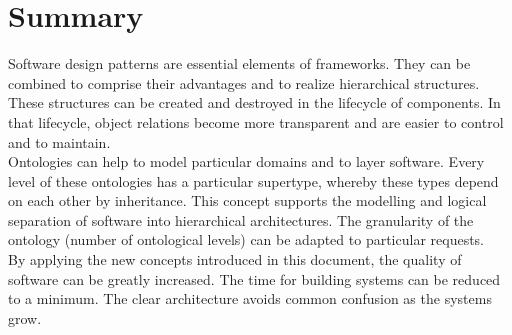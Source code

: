 %
%
%
%
%
%
%

\section{Summary}
\label{summary_heading}

Software design patterns are essential elements of frameworks. They can be
combined to comprise their advantages and to realize hierarchical structures.
These structures can be created and destroyed in the lifecycle of components.
In that lifecycle, object relations become more transparent and are easier to
control and to maintain.\\
Ontologies can help to model particular domains and to layer software. Every level
of these ontologies has a particular supertype, whereby these types depend on each
other by inheritance. This concept supports the modelling and logical separation
of software into hierarchical architectures. The granularity of the ontology
(number of ontological levels) can be adapted to particular requests.\\
By applying the new concepts introduced in this document, the quality of software
can be greatly increased. The time for building systems can be reduced to a minimum.
The clear architecture avoids common confusion as the systems grow.

